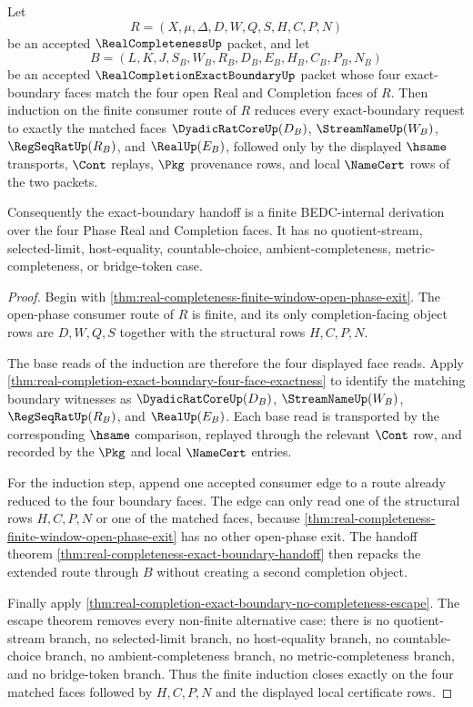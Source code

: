 \begin{theorem}
\label{thm:real-completeness-exact-boundary-finite-induction}
Let
$$
R=(X,\mu,\Delta,D,W,Q,S,H,C,P,N)
$$
be an accepted $\RealCompletenessUp$ packet, and let
$$
B=(L,K,J,S_B,W_B,R_B,D_B,E_B,H_B,C_B,P_B,N_B)
$$
be an accepted $\RealCompletionExactBoundaryUp$ packet whose four exact-boundary faces match the four open Real and Completion faces of $R$. Then induction on the finite consumer route of $R$ reduces every exact-boundary request to exactly the matched faces $\DyadicRatCoreUp(D_B)$, $\StreamNameUp(W_B)$, $\RegSeqRatUp(R_B)$, and $\RealUp(E_B)$, followed only by the displayed $\hsame$ transports, $\Cont$ replays, $\Pkg$ provenance rows, and local $\NameCert$ rows of the two packets.

Consequently the exact-boundary handoff is a finite BEDC-internal derivation over the four Phase Real and Completion faces. It has no quotient-stream, selected-limit, host-equality, countable-choice, ambient-completeness, metric-completeness, or bridge-token case.
\end{theorem}
\begin{proof}
Begin with \autoref{thm:real-completeness-finite-window-open-phase-exit}. The open-phase consumer route of $R$ is finite, and its only completion-facing object rows are $D,W,Q,S$ together with the structural rows $H,C,P,N$.

The base reads of the induction are therefore the four displayed face reads. Apply \autoref{thm:real-completion-exact-boundary-four-face-exactness} to identify the matching boundary witnesses as $\DyadicRatCoreUp(D_B)$, $\StreamNameUp(W_B)$, $\RegSeqRatUp(R_B)$, and $\RealUp(E_B)$. Each base read is transported by the corresponding $\hsame$ comparison, replayed through the relevant $\Cont$ row, and recorded by the $\Pkg$ and local $\NameCert$ entries.

For the induction step, append one accepted consumer edge to a route already reduced to the four boundary faces. The edge can only read one of the structural rows $H,C,P,N$ or one of the matched faces, because \autoref{thm:real-completeness-finite-window-open-phase-exit} has no other open-phase exit. The handoff theorem \autoref{thm:real-completeness-exact-boundary-handoff} then repacks the extended route through $B$ without creating a second completion object.

Finally apply \autoref{thm:real-completion-exact-boundary-no-completeness-escape}. The escape theorem removes every non-finite alternative case: there is no quotient-stream branch, no selected-limit branch, no host-equality branch, no countable-choice branch, no ambient-completeness branch, no metric-completeness branch, and no bridge-token branch. Thus the finite induction closes exactly on the four matched faces followed by $H,C,P,N$ and the displayed local certificate rows.
\end{proof}

